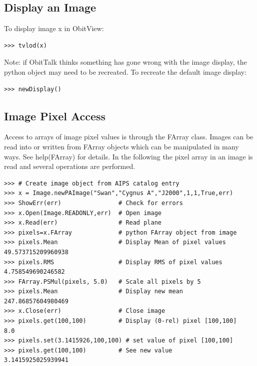 \documentclass[11pt]{report}
\begin{document}
\subsection{Display an Image}
To display image x in ObitView:
\begin{verbatim}
>>> tvlod(x)
\end{verbatim}
Note: if ObitTalk thinks something has gone wrong with the image
display, the python object may need to be recreated.
To recreate the default image display:
\begin{verbatim}
>>> newDisplay()
\end{verbatim}

\subsection{Image Pixel Access}
Access to arrays of image pixel values is through the FArray class.
Images can be read into or written from FArray objects which can be
manipulated in many ways.
See help(FArray) for details.
In the following the pixel array in an image is read and several
operations are performed.
\begin{verbatim}
>>> # Create image object from AIPS catalog entry
>>> x = Image.newPAImage("Swan","Cygnus A","J2000",1,1,True,err)
>>> ShowErr(err)                # Check for errors
>>> x.Open(Image.READONLY,err)  # Open image
>>> x.Read(err)                 # Read plane
>>> pixels=x.FArray             # python FArray object from image
>>> pixels.Mean                 # Display Mean of pixel values
49.573715209960938 
>>> pixels.RMS                  # Display RMS of pixel values
4.758549690246582
>>> FArray.PSMul(pixels, 5.0)   # Scale all pixels by 5
>>> pixels.Mean                 # Display new mean
247.86857604980469
>>> x.Close(err)                # Close image
>>> pixels.get(100,100)         # Display (0-rel) pixel [100,100]
8.0
>>> pixels.set(3.1415926,100,100) # set value of pixel [100,100]
>>> pixels.get(100,100)         # See new value
3.1415925025939941

\end{verbatim}
\end{document}
